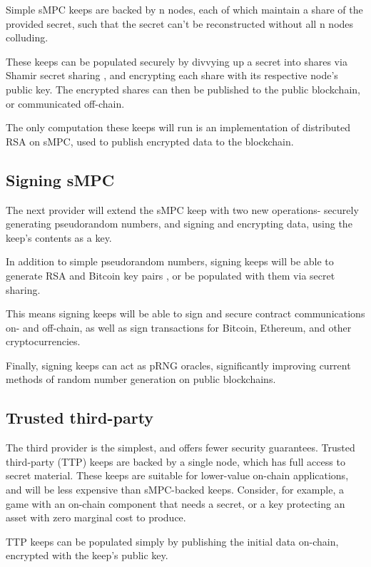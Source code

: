 \documentclass[11pt]{article}
\begin{document}
Simple sMPC keeps are backed by n nodes, each of which maintain a
share of the provided secret, such that the secret can’t be
reconstructed without all n nodes colluding.

These keeps can be populated securely by divvying up a secret into
shares via Shamir secret sharing \cite{shamir}, and encrypting each
share with its respective node’s public key. The encrypted shares can
then be published to the public blockchain, or communicated off-chain.

The only computation these keeps will run is an implementation of
distributed RSA \cite{mauland2009realizing} on sMPC, used to publish
encrypted data to the blockchain.


\subsection{Signing sMPC}

The next provider will extend the sMPC keep with two new operations-
securely generating pseudorandom numbers, and signing and encrypting
data, using the keep’s contents as a key.

In addition to simple pseudorandom numbers, signing keeps will be able
to generate RSA \cite{mauland2009realizing} and Bitcoin key pairs
\cite{coinparty}, or be populated with them via secret sharing.

This means signing keeps will be able to sign and secure contract
communications on- and off-chain, as well as sign transactions for
Bitcoin, Ethereum, and other cryptocurrencies.

Finally, signing keeps can act as pRNG oracles, significantly
improving current methods of random number generation on public
blockchains.


\subsection{Trusted third-party}

The third provider is the simplest, and offers fewer security
guarantees. Trusted third-party (TTP) keeps are backed by a single
node, which has full access to secret material. These keeps are
suitable for lower-value on-chain applications, and will be less
expensive than sMPC-backed keeps. Consider, for example, a game with
an on-chain component that needs a secret, or a key protecting an
asset with zero marginal cost to produce.

TTP keeps can be populated simply by publishing the initial data
on-chain, encrypted with the keep’s public key.
\end{document}
